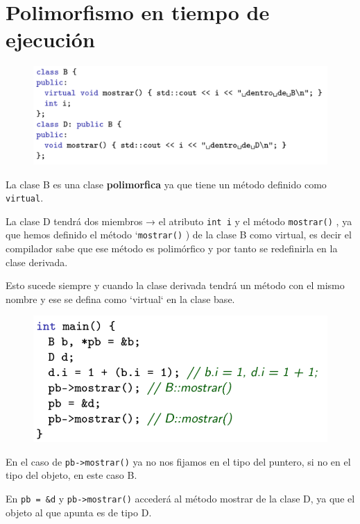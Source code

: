 \section{Polimorfismo en tiempo de ejecución}
\begin{figure}[h]
	\begin{center}
		\includegraphics[width=\textwidth]{Imagenes/pol1.png}
	\end{center}
\end{figure}
La clase B es una clase \textbf{polimorfica} ya que tiene un método definido como \texttt {virtual}.

La clase D tendrá dos miembros → el atributo \texttt{int i} y el método \texttt{mostrar()} , ya que hemos definido el método `\texttt{mostrar()} ) de la clase B como virtual, es decir el compilador sabe que ese método es polimórfico y por tanto se redefinirla en la clase derivada.

Esto sucede siempre y cuando la clase derivada tendrá un método con el mismo nombre y ese se defina como `virtual` en la clase base.
\begin{figure}[h]
	\begin{center}
		\includegraphics[width=\textwidth]{Imagenes/pol2.png}
	\end{center}
\end{figure}

En el caso de \texttt{pb->mostrar()} ya no nos fijamos en el tipo del puntero, si no en el tipo del objeto, en este caso B. 

En \texttt{pb = \&d} y \texttt{pb->mostrar()} accederá al método mostrar de la clase D, ya que el objeto al que apunta es de tipo D.

